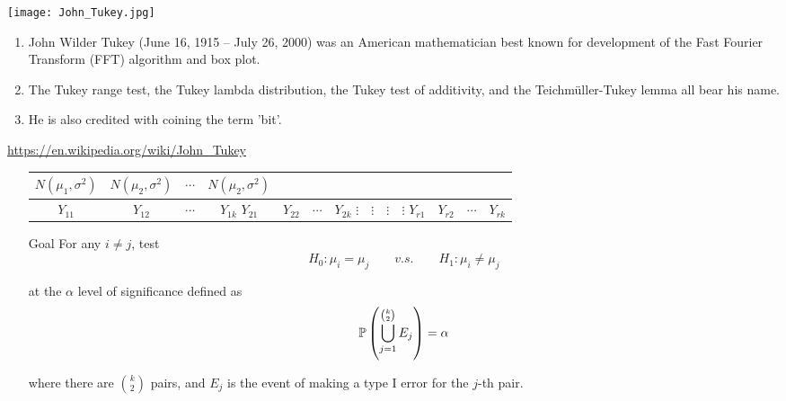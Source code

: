 \begin{frame}
\begin{center}
	\texttt{[image: John\_Tukey.jpg]} \\[2em]
	\small
	\begin{enumerate}
	\item John Wilder Tukey (June 16, 1915 -- July 26, 2000)
		was an American mathematician best known for
		development of the Fast Fourier Transform (FFT) algorithm and box plot.
	\item The Tukey range test, the Tukey lambda distribution,
		the Tukey test of additivity,
		and the Teichm\"uller-Tukey lemma all bear his name.
	\item  He is also credited with coining the term 'bit'.
	\end{enumerate}
	\vfill
	\url{https://en.wikipedia.org/wiki/John_Tukey}
	\end{center}
\end{frame}
\begin{frame}[fragile]

	\begin{enumerate}
		\item[]
	\begin{center}
		\begin{tabular}{cccc}
			$N(\mu_1,\sigma^2)$ & $N(\mu_2,\sigma^2)$ & $\cdots$ & $N(\mu_2,\sigma^2)$ \\
			\hline
			$Y_{11}$ & $Y_{12}$ & $\cdots$ & $Y_{1k}$\cr
			$Y_{21}$ & $Y_{22}$ & $\cdots$ & $Y_{2k}$\cr
			$\vdots$ & $\vdots$ & $\vdots$ & $\vdots$\cr
			$Y_{r1}$ & $Y_{r2}$ & $\cdots$ & $Y_{rk}$\cr
			\hline
		\end{tabular}
	\end{center}
	\vfill
\item[Goal] For any $i\ne j$, test
	\[
	H_0: \mu_i =\mu_j \qquad v.s. \qquad H_1: \mu_i\ne \mu_j
	\]
	\vfill
\item[] at the $\alpha$ level of significance defined as
	\[
		\mathbb{P} \left(\bigcup_{j=1}^{{k\choose 2}}E_j\right) = \alpha
	\]
\item[] where there are ${k\choose 2}$ pairs, and $E_j$ is the event of making a type I error for the $j$-th pair.
	\end{enumerate}

\end{frame}
